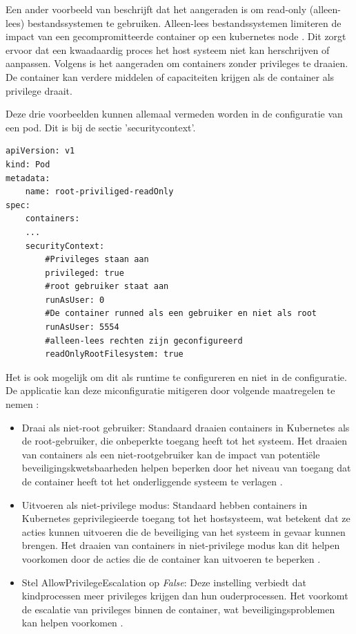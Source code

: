 Een ander voorbeeld van \textcite{OWASP-2023} beschrijft dat het aangeraden is om read-only (alleen-lees) bestandssystemen te gebruiken. Alleen-lees bestandssystemen limiteren de impact van een gecompromitteerde container op een kubernetes node \autocite{OWASP-2023}. Dit zorgt ervoor dat een kwaadaardig proces het host systeem niet kan herschrijven of aanpassen. Volgens \textcite{OWASP-2023} is het aangeraden om containers zonder privileges te draaien. De container kan verdere middelen of capaciteiten krijgen als de container als privilege draait. \newline

Deze drie voorbeelden kunnen allemaal vermeden worden in de configuratie van een pod. Dit is bij de sectie 'securitycontext'. 
\begin{lstlisting}
apiVersion: v1  
kind: Pod  
metadata:  
    name: root-priviliged-readOnly
spec:  
    containers:  
    ...
    securityContext:  
        #Privileges staan aan 
        privileged: true
        #root gebruiker staat aan
        runAsUser: 0
        #De container runned als een gebruiker en niet als root
        runAsUser: 5554
        #alleen-lees rechten zijn geconfigureerd
        readOnlyRootFilesystem: true
\end{lstlisting}


Het is ook mogelijk om dit als runtime te configureren en niet in de configuratie. De applicatie kan deze miconfiguratie mitigeren door volgende maatregelen te nemen \autocite{OWASP-2023}:
\begin{itemize}
    \item Draai als niet-root gebruiker: Standaard draaien containers in Kubernetes als de root-gebruiker, die onbeperkte toegang heeft tot het systeem. Het draaien van containers als een niet-rootgebruiker kan de impact van potentiële beveiligingskwetsbaarheden helpen beperken door het niveau van toegang dat de container heeft tot het onderliggende systeem te verlagen \autocite{OWASP-2023}.
    \item Uitvoeren als niet-privilege modus: Standaard hebben containers in Kubernetes geprivilegieerde toegang tot het hostsysteem, wat betekent dat ze acties kunnen uitvoeren die de beveiliging van het systeem in gevaar kunnen brengen. Het draaien van containers in niet-privilege modus kan dit helpen voorkomen door de acties die de container kan uitvoeren te beperken \autocite{OWASP-2023}.
    \item Stel AllowPrivilegeEscalation op \textit{False}: Deze instelling verbiedt dat kindprocessen meer privileges krijgen dan hun ouderprocessen. Het voorkomt de escalatie van privileges binnen de container, wat beveiligingsproblemen kan helpen voorkomen \autocite{OWASP-2023}.
\end{itemize}

